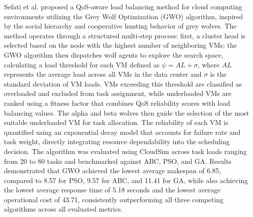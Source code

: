 \documentclass[pdflatex,sn-mathphys-num]{sn-jnl}%
\theoremstyle{thmstyleone}%
\theoremstyle{thmstyletwo}%
\theoremstyle{thmstylethree}%
\begin{document}
Sefati et al. \cite{bib9} proposed a QoS-aware load balancing method for cloud 
computing environments utilizing the Grey Wolf Optimization (GWO) algorithm, 
inspired by the social hierarchy and cooperative hunting behavior of grey wolves. 
The method operates through a structured multi-step process: first, a cluster head 
is selected based on the node with the highest number of neighboring VMs; the GWO 
algorithm then dispatches wolf agents to explore the search space, calculating a 
load threshold for each VM defined as $\psi = AL + \sigma$, where $AL$ represents 
the average load across all VMs in the data center and $\sigma$ is the standard 
deviation of VM loads. VMs exceeding this threshold are classified as overloaded 
and excluded from task assignment, while underloaded VMs are ranked using a fitness 
factor that combines QoS reliability scores with load balancing values. The alpha 
and beta wolves then guide the selection of the most suitable underloaded VM for 
task allocation. The reliability of each VM is quantified using an exponential 
decay model that accounts for failure rate and task weight, directly integrating 
resource dependability into the scheduling decision. The algorithm was evaluated 
using CloudSim across task loads ranging from 20 to 80 tasks and benchmarked 
against ABC, PSO, and GA. Results demonstrated that GWO achieved the lowest 
average makespan of 6.85, compared to 8.57 for PSO, 9.57 for ABC, and 11.41 for 
GA, while also achieving the lowest average response time of 5.18 seconds and the 
lowest average operational cost of 43.71, consistently outperforming all three 
competing algorithms across all evaluated metrics.
\end{document}

